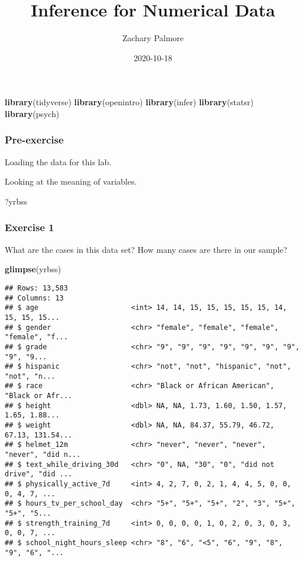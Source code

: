 \documentclass[
]{article}
\title{Inference for Numerical Data}
\author{Zachary Palmore}
\date{2020-10-18}
\newenvironment{Shaded}{\begin{snugshade}}{\end{snugshade}}
\newcommand{\KeywordTok}[1]{\textcolor[rgb]{0.13,0.29,0.53}{\textbf{#1}}}
\newcommand{\NormalTok}[1]{#1}
\begin{document}
\maketitle

\begin{Shaded}
\begin{Highlighting}[]
\KeywordTok{library}\NormalTok{(tidyverse)}
\KeywordTok{library}\NormalTok{(openintro)}
\KeywordTok{library}\NormalTok{(infer)}
\KeywordTok{library}\NormalTok{(statsr)}
\KeywordTok{library}\NormalTok{(psych)}
\end{Highlighting}
\end{Shaded}

\hypertarget{pre-exercise}{%
\subsubsection{Pre-exercise}\label{pre-exercise}}

Loading the data for this lab.

Looking at the meaning of variables.

\begin{Shaded}
\begin{Highlighting}[]
\NormalTok{?yrbss}
\end{Highlighting}
\end{Shaded}

\hypertarget{exercise-1}{%
\subsubsection{Exercise 1}\label{exercise-1}}

What are the cases in this data set? How many cases are there in our
sample?

\begin{Shaded}
\begin{Highlighting}[]
\KeywordTok{glimpse}\NormalTok{(yrbss)}
\end{Highlighting}
\end{Shaded}

\begin{verbatim}
## Rows: 13,583
## Columns: 13
## $ age                      <int> 14, 14, 15, 15, 15, 15, 15, 14, 15, 15, 15...
## $ gender                   <chr> "female", "female", "female", "female", "f...
## $ grade                    <chr> "9", "9", "9", "9", "9", "9", "9", "9", "9...
## $ hispanic                 <chr> "not", "not", "hispanic", "not", "not", "n...
## $ race                     <chr> "Black or African American", "Black or Afr...
## $ height                   <dbl> NA, NA, 1.73, 1.60, 1.50, 1.57, 1.65, 1.88...
## $ weight                   <dbl> NA, NA, 84.37, 55.79, 46.72, 67.13, 131.54...
## $ helmet_12m               <chr> "never", "never", "never", "never", "did n...
## $ text_while_driving_30d   <chr> "0", NA, "30", "0", "did not drive", "did ...
## $ physically_active_7d     <int> 4, 2, 7, 0, 2, 1, 4, 4, 5, 0, 0, 0, 4, 7, ...
## $ hours_tv_per_school_day  <chr> "5+", "5+", "5+", "2", "3", "5+", "5+", "5...
## $ strength_training_7d     <int> 0, 0, 0, 0, 1, 0, 2, 0, 3, 0, 3, 0, 0, 7, ...
## $ school_night_hours_sleep <chr> "8", "6", "<5", "6", "9", "8", "9", "6", "...
\end{verbatim}
\end{document}
